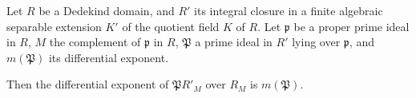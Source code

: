 Let $R$ be a Dedekind domain, and $R'$ its integral closure in a finite algebraic separable extension $K'$ of the quotient field $K$ of $R$. Let $\mathfrak{p}$ be a proper prime ideal in $R$, $M$ the complement of $\mathfrak{p}$ in $R$, $\mathfrak{P}$ a prime ideal in $R'$ lying over $\mathfrak{p}$, and $m(\mathfrak{P})$ its differential exponent.

Then the differential exponent of $\mathfrak{P}R'_M$ over $R_M$ is $m(\mathfrak{P})$.
